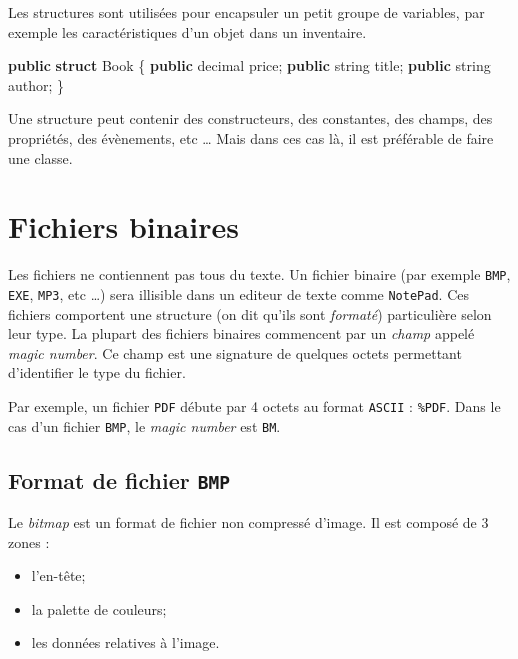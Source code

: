 \documentclass[11pt, a4paper]{article}
\newenvironment{Shaded}{}{}
\newcommand{\KeywordTok}[1]{\textcolor[rgb]{0.00,0.44,0.13}{\textbf{{#1}}}}
\newcommand{\DataTypeTok}[1]{\textcolor[rgb]{0.56,0.13,0.00}{{#1}}}
\newcommand{\NormalTok}[1]{{#1}}
\begin{document}
Les structures sont utilisées pour encapsuler un petit groupe de
variables, par exemple les caractéristiques d'un objet dans un
inventaire.

\begin{Shaded}
\begin{Highlighting}[]
\KeywordTok{public} \KeywordTok{struct} \NormalTok{Book}
\NormalTok{\{}
    \KeywordTok{public} \DataTypeTok{decimal} \NormalTok{price;}
    \KeywordTok{public} \DataTypeTok{string} \NormalTok{title;}
    \KeywordTok{public} \DataTypeTok{string} \NormalTok{author;}
\NormalTok{\}}
\end{Highlighting}
\end{Shaded}

Une structure peut contenir des constructeurs, des constantes, des
champs, des propriétés, des évènements, etc \ldots{} Mais dans ces cas
là, il est préférable de faire une classe.
\section{Fichiers binaires}\label{fichiers-binaires}

Les fichiers ne contiennent pas tous du texte. Un fichier binaire (par
exemple \texttt{BMP}, \texttt{EXE}, \texttt{MP3}, etc \ldots{}) sera
illisible dans un editeur de texte comme \texttt{NotePad}. Ces fichiers
comportent une structure (on dit qu'ils sont \emph{formaté})
particulière selon leur type. La plupart des fichiers binaires
commencent par un \emph{champ} appelé \emph{magic number}. Ce champ est
une signature de quelques octets permettant d'identifier le type du
fichier.

Par exemple, un fichier \texttt{PDF} débute par 4 octets au format
\texttt{ASCII} : \texttt{\%PDF}. Dans le cas d'un fichier \texttt{BMP},
le \emph{magic number} est \texttt{BM}.

\subsection{Format de fichier \texttt{BMP}}\label{format-de-fichier-bmp}

Le \emph{bitmap} est un format de fichier non compressé d'image. Il est
composé de 3 zones :

\begin{itemize}
\itemsep1pt\parskip0pt
\item
  l'en-tête;
\item
  la palette de couleurs;
\item
  les données relatives à l'image.\newline
\end{itemize}
\end{document}
